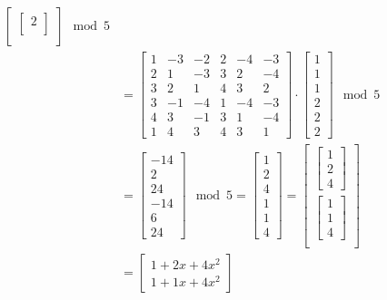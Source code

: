 \begin{align*}
{\begin{bmatrix}
\begin{bmatrix}
      2 \\
    \end{bmatrix} \\
  \end{bmatrix}
  }                    \mod 5 \\
                  & = {
  \begin{bmatrix}
    1 & -3 & -2 & 2 & -4 & -3  \\
    2 & 1  & -3 & 3 & 2  & -4  \\
    3 & 2  & 1  & 4 & 3  & 2   \\
    3 & -1 & -4 & 1 & -4 & -3  \\
    4 & 3  & -1 & 3 & 1  & -4  \\
    1 & 4  & 3  & 4 & 3  & 1 
  \end{bmatrix}
  \cdot
  \begin{bmatrix}
    1 \\
    1 \\
    1 \\
    2 \\
    2 \\
    2 
  \end{bmatrix}
  }               \mod 5      \\
                  & = {
  \begin{bmatrix}
    -14 \\
    2   \\
    24  \\
    -14 \\
    6   \\
    24
  \end{bmatrix}
  \mod 5
  }
  = {
  \begin{bmatrix}
    1 \\
    2 \\
    4 \\
    1 \\
    1 \\
    4
  \end{bmatrix}
  }
  = {
  \begin{bmatrix}
    \begin{bmatrix}
      1 \\
      2 \\
      4
    \end{bmatrix} \\
    \begin{bmatrix}
      1 \\
      1 \\
      4
    \end{bmatrix} \\
  \end{bmatrix}
  }                           \\
                  & = {
  \begin{bmatrix}
    1+2x+4x^2 \\
    1+1x+4x^2
  \end{bmatrix}
  }
\end{align*}


